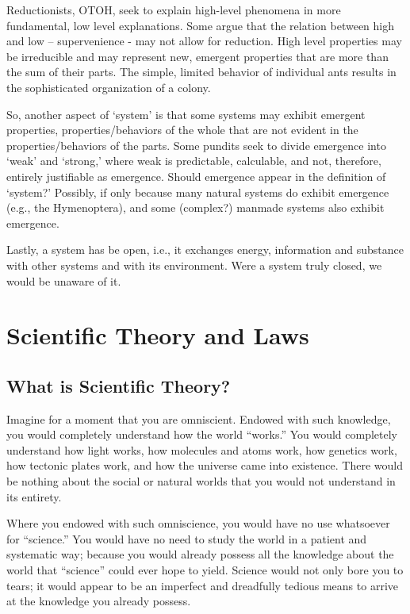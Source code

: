 Reductionists, OTOH, seek to explain high-level phenomena in more fundamental, low level explanations. Some argue that the relation between high and low – supervenience - may not allow for reduction. High level properties may be irreducible and may represent new, emergent properties that are more than the sum of their parts. The simple, limited behavior of individual ants results in the sophisticated organization of a colony.

So, another aspect of `system’ is that some systems may exhibit emergent properties, properties/behaviors of the whole that are not evident in the properties/behaviors of the parts. Some pundits seek to divide emergence into `weak’ and `strong,’ where weak is predictable, calculable, and not, therefore, entirely justifiable as emergence. Should emergence appear in the definition of `system?’  Possibly, if only because many natural systems do exhibit emergence (e.g., the Hymenoptera), and some (complex?) manmade systems also exhibit emergence.

Lastly, a system has be open, i.e., it exchanges energy, information and substance with other systems and with its environment. Were a system truly closed, we would be unaware of it.


\section{Scientific Theory and Laws}

\subsection{What is Scientific Theory?}

Imagine for a moment that you are omniscient. Endowed with such knowledge, you would completely understand how the world ``works.''  You would completely understand how light works, how molecules and atoms work, how genetics work, how tectonic plates work, and how the universe came into existence. There would be nothing about the social or natural worlds that you would not understand in its entirety.

Where you endowed with such omniscience, you would have no use whatsoever for ``science.''  You would have no need to study the world in a patient and systematic way; because you would already possess all the knowledge about the world that ``science'' could ever hope to yield. Science would not only bore you to tears; it would appear to be an imperfect and dreadfully tedious means to arrive at the knowledge you already possess.

